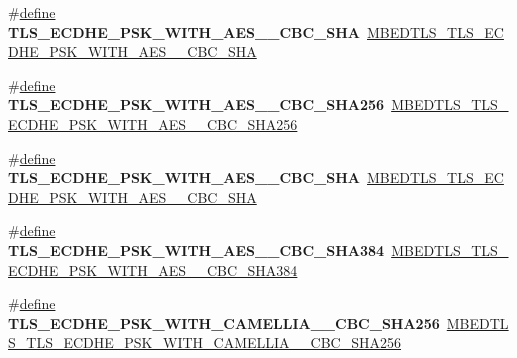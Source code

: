 \begin{DoxyCompactItemize}
\item 
\mbox{\label{compat-1_83_8h_a21c57f86ab2bb68a2436ecddaf69a7b4}} 
\#\hyperlink{structdefine}{define} {\bfseries T\+L\+S\+\_\+\+E\+C\+D\+H\+E\+\_\+\+P\+S\+K\+\_\+\+W\+I\+T\+H\+\_\+\+A\+E\+S\+\_\+\_\+\+C\+B\+C\+\_\+\+S\+HA}~\hyperlink{ssl__ciphersuites_8h_a5e96a17bad57e86ec12f40f1107788b6}{M\+B\+E\+D\+T\+L\+S\+\_\+\+T\+L\+S\+\_\+\+E\+C\+D\+H\+E\+\_\+\+P\+S\+K\+\_\+\+W\+I\+T\+H\+\_\+\+A\+E\+S\+\_\+\_\+\+C\+B\+C\+\_\+\+S\+HA}
\item 
\mbox{\label{compat-1_83_8h_adc45f48d71a6fd3c0d3bfd46dc4dfabf}} 
\#\hyperlink{structdefine}{define} {\bfseries T\+L\+S\+\_\+\+E\+C\+D\+H\+E\+\_\+\+P\+S\+K\+\_\+\+W\+I\+T\+H\+\_\+\+A\+E\+S\+\_\+\_\+\+C\+B\+C\+\_\+\+S\+H\+A256}~\hyperlink{ssl__ciphersuites_8h_a97a69259835f6891d51813068f084ef5}{M\+B\+E\+D\+T\+L\+S\+\_\+\+T\+L\+S\+\_\+\+E\+C\+D\+H\+E\+\_\+\+P\+S\+K\+\_\+\+W\+I\+T\+H\+\_\+\+A\+E\+S\+\_\+\_\+\+C\+B\+C\+\_\+\+S\+H\+A256}
\item 
\mbox{\label{compat-1_83_8h_a17ca9c450c5228938a75f964f90db9cb}} 
\#\hyperlink{structdefine}{define} {\bfseries T\+L\+S\+\_\+\+E\+C\+D\+H\+E\+\_\+\+P\+S\+K\+\_\+\+W\+I\+T\+H\+\_\+\+A\+E\+S\+\_\+\_\+\+C\+B\+C\+\_\+\+S\+HA}~\hyperlink{ssl__ciphersuites_8h_acb735791d25d93a6aefe489c6795f9fa}{M\+B\+E\+D\+T\+L\+S\+\_\+\+T\+L\+S\+\_\+\+E\+C\+D\+H\+E\+\_\+\+P\+S\+K\+\_\+\+W\+I\+T\+H\+\_\+\+A\+E\+S\+\_\+\_\+\+C\+B\+C\+\_\+\+S\+HA}
\item 
\mbox{\label{compat-1_83_8h_a19782b5bb8923092f3268f6ce5ef2f76}} 
\#\hyperlink{structdefine}{define} {\bfseries T\+L\+S\+\_\+\+E\+C\+D\+H\+E\+\_\+\+P\+S\+K\+\_\+\+W\+I\+T\+H\+\_\+\+A\+E\+S\+\_\+\_\+\+C\+B\+C\+\_\+\+S\+H\+A384}~\hyperlink{ssl__ciphersuites_8h_a6eaae8a34db3908aa0ca1dd0bfd34f26}{M\+B\+E\+D\+T\+L\+S\+\_\+\+T\+L\+S\+\_\+\+E\+C\+D\+H\+E\+\_\+\+P\+S\+K\+\_\+\+W\+I\+T\+H\+\_\+\+A\+E\+S\+\_\+\_\+\+C\+B\+C\+\_\+\+S\+H\+A384}
\item 
\mbox{\label{compat-1_83_8h_a0351fc50dbe3d63ae06b4a6ff7c033a6}} 
\#\hyperlink{structdefine}{define} {\bfseries T\+L\+S\+\_\+\+E\+C\+D\+H\+E\+\_\+\+P\+S\+K\+\_\+\+W\+I\+T\+H\+\_\+\+C\+A\+M\+E\+L\+L\+I\+A\+\_\+\_\+\+C\+B\+C\+\_\+\+S\+H\+A256}~\hyperlink{ssl__ciphersuites_8h_afcf557653ff7276108a9065d69f1a545}{M\+B\+E\+D\+T\+L\+S\+\_\+\+T\+L\+S\+\_\+\+E\+C\+D\+H\+E\+\_\+\+P\+S\+K\+\_\+\+W\+I\+T\+H\+\_\+\+C\+A\+M\+E\+L\+L\+I\+A\+\_\+\_\+\+C\+B\+C\+\_\+\+S\+H\+A256}

\end{DoxyCompactItemize}
